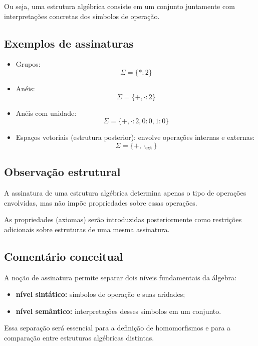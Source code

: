 \documentclass[../../main]{subfiles}
\begin{document}
Ou seja, uma estrutura algébrica consiste em um conjunto juntamente com interpretações concretas dos símbolos de operação.

\subsection{Exemplos de assinaturas}

\begin{itemize}
	\item Grupos:
	      \[
		      \Sigma = \{\ast : 2\}
	      \]

	\item Anéis:
	      \[
		      \Sigma = \{+, \cdot : 2\}
	      \]

	\item Anéis com unidade:
	      \[
		      \Sigma = \{+, \cdot : 2, 0 : 0, 1 : 0\}
	      \]

	\item Espaços vetoriais (estrutura posterior):
	      envolve operações internas e externas:
	      \[
		      \Sigma = \{+, \cdot_{\text{ext}}\}
	      \]
\end{itemize}

\subsection{Observação estrutural}

A assinatura de uma estrutura algébrica determina apenas o tipo de operações envolvidas, mas não impõe propriedades sobre essas operações.

As propriedades (axiomas) serão introduzidas posteriormente como restrições adicionais sobre estruturas de uma mesma assinatura.

\subsection{Comentário conceitual}

A noção de assinatura permite separar dois níveis fundamentais da álgebra:

\begin{itemize}
	\item \textbf{nível sintático:} símbolos de operação e suas aridades;
	\item \textbf{nível semântico:} interpretações desses símbolos em um conjunto.
\end{itemize}

Essa separação será essencial para a definição de homomorfismos e para a comparação entre estruturas algébricas distintas.
\end{document}
